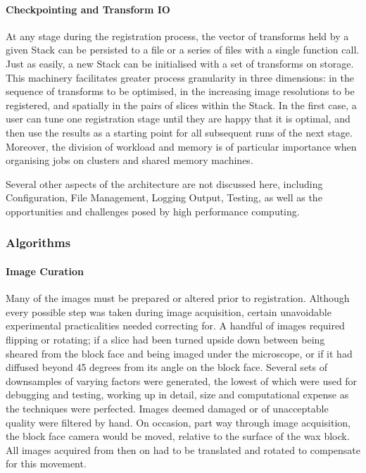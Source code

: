       \paragraph{Checkpointing and Transform IO}
        At any stage during the registration process, the vector of transforms held by a given Stack can be persisted to a file or a series of files with a single function call. Just as easily, a new Stack can be initialised with a set of transforms on storage. This machinery facilitates greater process granularity in three dimensions: in the sequence of transforms to be optimised, in the increasing image resolutions to be registered, and spatially in the pairs of slices within the Stack. In the first case, a user can tune one registration stage until they are happy that it is optimal, and then use the results as a starting point for all subsequent runs of the next stage. Moreover, the division of workload and memory is of particular importance when organising jobs on clusters and shared memory machines.
  
        \vspace{3 mm}

        Several other aspects of the architecture are not discussed here, including Configuration, File Management, Logging Output, Testing, as well as the opportunities and challenges posed by high performance computing.
  \subsubsection{Algorithms}
      \paragraph{Image Curation}
        Many of the images must be prepared or altered prior to registration. Although every possible step was taken during image acquisition, certain unavoidable experimental practicalities needed correcting for. A handful of images required flipping or rotating; if a slice had been turned upside down between being sheared from the block face and being imaged under the microscope, or if it had diffused beyond 45 degrees from its angle on the block face. Several sets of downsamples of varying factors were generated, the lowest of which were used for debugging and testing, working up in detail, size and computational expense as the techniques were perfected. Images deemed damaged or of unacceptable quality were filtered by hand. On occasion, part way through image acquisition, the block face camera would be moved, relative to the surface of the wax block. All images acquired from then on had to be translated and rotated to compensate for this movement.

